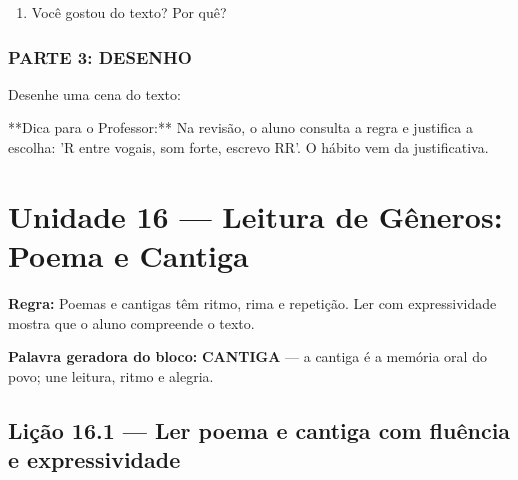 \begin{exercicio}
\begin{enumerate}
  \item Você gostou do texto? Por quê?
  \begin{center}
  \underline{\hspace{12cm}}
  \end{center}

\end{enumerate}

\subsection*{PARTE 3: DESENHO}

Desenhe uma cena do texto:

\begin{center}
\end{center}

\end{exercicio}

\begin{dica}
**Dica para o Professor:** Na revisão, o aluno consulta a regra e justifica a escolha: 'R entre vogais, som forte, escrevo RR'. O hábito vem da justificativa.
\end{dica}


\chapter{Unidade 16 --- Leitura de Gêneros: Poema e Cantiga}


\textbf{Regra:} Poemas e cantigas têm ritmo, rima e repetição. Ler com expressividade mostra que o aluno compreende o texto.

\textbf{Palavra geradora do bloco:} \textbf{CANTIGA} --- a cantiga é a memória oral do povo; une leitura, ritmo e alegria.

\section{Lição 16.1 --- Ler poema e cantiga com fluência e expressividade}

